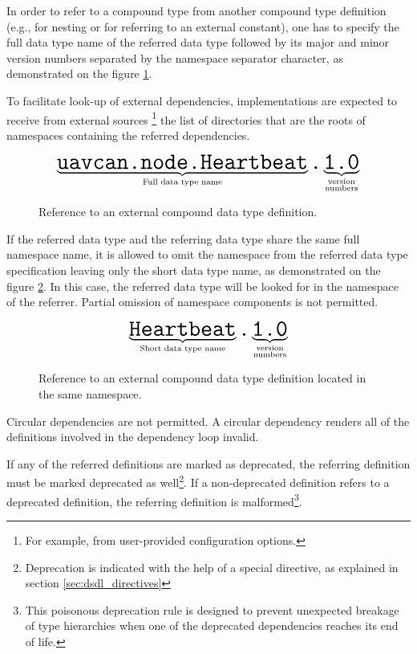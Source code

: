 In order to refer to a compound type from another compound type definition
(e.g., for nesting or for referring to an external constant),
one has to specify the full data type name of the referred data type followed by its
major and minor version numbers separated by the namespace separator character,
as demonstrated on the figure \ref{fig:dsdl_nested_reference}.

To facilitate look-up of external dependencies,
implementations are expected to receive from external sources%
\footnote{For example, from user-provided configuration options.}
the list of directories that are the roots of namespaces containing the referred dependencies.

\begin{figure}[H]
    $$
    \underbrace{\texttt{\huge{uavcan.node.Heartbeat}}}_{\text{Full data type name}}%
    \texttt{\huge{.}}%
    \underbrace{\texttt{\huge{1.0}}}_{\substack{\text{version} \\ \text{numbers}}}%
    $$
    \caption{Reference to an external compound data type definition.\label{fig:dsdl_nested_reference}}
\end{figure}

If the referred data type and the referring data type share the same full namespace name,
it is allowed to omit the namespace from the referred data type specification
leaving only the short data type name, as demonstrated on the figure \ref{fig:dsdl_nested_reference_short}.
In this case, the referred data type will be looked for in the namespace of the referrer.
Partial omission of namespace components is not permitted.

\begin{figure}[H]
    $$
    \underbrace{\texttt{\huge{Heartbeat}}}_{\text{Short data type name}}%
    \texttt{\huge{.}}%
    \underbrace{\texttt{\huge{1.0}}}_{\substack{\text{version} \\ \text{numbers}}}%
    $$
    \caption{Reference to an external compound data type definition located in the same namespace.
    \label{fig:dsdl_nested_reference_short}}
\end{figure}

Circular dependencies are not permitted.
A circular dependency renders all of the definitions involved in the dependency loop invalid.

If any of the referred definitions are marked as deprecated,
the referring definition must be marked deprecated as well\footnote{%
Deprecation is indicated with the help of a special directive, as explained in section \ref{sec:dsdl_directives}}.
If a non-deprecated definition refers to a deprecated definition,
the referring definition is malformed\footnote{%
This poisonous deprecation rule is designed to prevent unexpected breakage of
type hierarchies when one of the deprecated dependencies reaches its end of life.}.

